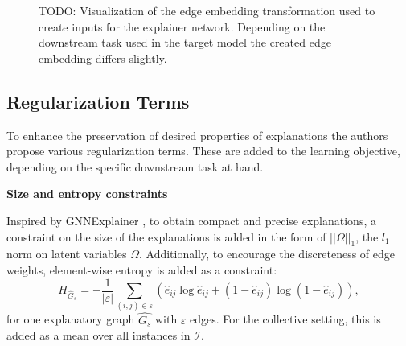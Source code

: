 \begin{figure}
\caption{TODO: Visualization of the edge embedding transformation used to create inputs for the explainer network. Depending on the downstream task used in the target model the created edge embedding differs slightly.}
\end{figure}

\subsection{Regularization Terms}
\label{sec:Regularization_Terms}
To enhance the preservation of desired properties of explanations the authors propose various regularization terms. These are added to the learning objective, depending on the specific downstream task at hand.\bigskip

\textbf{Size and entropy constraints}

Inspired by GNNExplainer \cite{ying2019gnnexplainer}, to obtain compact and precise explanations, a constraint on the size of the explanations is added in the form of $||\Omega||_1$, the $l_1$ norm on latent variables $\Omega$. Additionally, to encourage the discreteness of edge weights, element-wise entropy is added as a constraint:
\begin{equation}
    H_{\hat{G}_s} = -\frac{1}{|\varepsilon|}\sum_{(i,j)\in \varepsilon} (\hat{e}_{ij}\log \hat{e}_{ij} + (1-\hat{e}_{ij})\log(1-\hat{e}_{ij})),
\end{equation}
for one explanatory graph $\hat{G_s}$ with $\varepsilon$ edges. For the collective setting, this is added as a mean over all instances in $\mathcal{I}$. \bigskip

